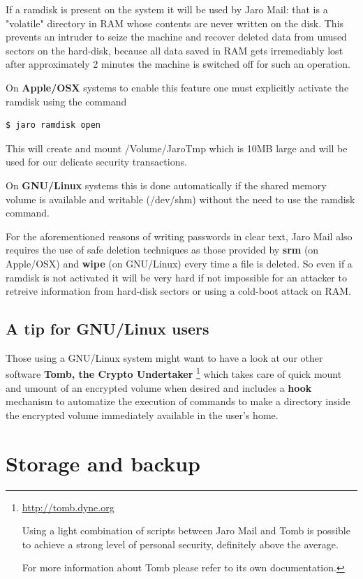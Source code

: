 \documentclass[a4,onecolumn,portrait]{article}
\begin{document}
If a ramdisk is present on the system it will be used by Jaro Mail:
that is a "volatile" directory in RAM whose contents are never written
on the disk. This prevents an intruder to seize the machine and
recover deleted data from unused sectors on the hard-disk, because all
data saved in RAM gets irremediably lost after approximately 2 minutes
the machine is switched off for such an operation.

On \textbf{Apple/OSX} systems to enable this feature one must explicitly
activate the ramdisk using the command

\begin{verbatim}
$ jaro ramdisk open
\end{verbatim}

This will create and mount /Volume/JaroTmp which is 10MB large and
will be used for our delicate security transactions.

On \textbf{GNU/Linux} systems this is done automatically if the shared memory
volume is available and writable (/dev/shm) without the need to use
the ramdisk command.

For the aforementioned reasons of writing passwords in clear text,
Jaro Mail also requires the use of safe deletion techniques as those
provided by \textbf{srm} (on Apple/OSX) and \textbf{wipe} (on GNU/Linux) every time
a file is deleted. So even if a ramdisk is not activated it will be
very hard if not impossible for an attacker to retreive information
from hard-disk sectors or using a cold-boot attack on RAM.
\subsection{A tip for GNU/Linux users}
\label{sec-8-3}

Those using a GNU/Linux system might want to have a look at our other
software \textbf{Tomb, the Crypto Undertaker} \footnote{\url{http://tomb.dyne.org}

Using a light combination of scripts between Jaro Mail and Tomb is
possible to achieve a strong level of personal security, definitely
above the average.

For more information about Tomb please refer to its own documentation.} which takes care of quick mount
and umount of an encrypted volume when desired and includes a \textbf{hook}
mechanism to automatize the execution of commands to make a directory
inside the encrypted volume immediately available in the user's home.

\section{Storage and backup}
\label{sec-9}
\end{document}
